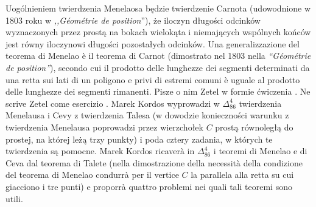 Uogólnieniem twierdzenia Menelaosa będzie twierdzenie Carnota (udowodnione w 1803 roku w \emph{,,Géométrie de position}''), że iloczyn długości odcinków wyznaczonych przez prostą na bokach wielokąta i niemających wspólnych końców jest równy iloczynowi długości pozostałych odcinków. %
Una generalizzazione del teorema di Menelao è il teorema di Carnot (dimostrato nel 1803 nella \emph{``Géométrie de position''}), secondo cui il prodotto delle lunghezze dei segmenti determinati da una retta sui lati di un poligono e privi di estremi comuni è uguale al prodotto delle lunghezze dei segmenti rimanenti. %
Pisze o nim Zetel w formie ćwiczenia \cite[s. 45]{zetel_2020}. %
Ne scrive Zetel come esercizio \cite[p. 45]{zetel_2020}. %
Marek Kordos wyprowadzi w $\Delta_{86}^{4}$ twierdzenia Menelausa i Cevy z twierdzenia Talesa (w dowodzie konieczności warunku z twierdzenia Menelausa poprowadzi przez wierzchołek $C$ prostą równoległą do prostej, na której leżą trzy punkty) i poda cztery zadania, w których te twierdzenia są pomocne. %
Marek Kordos ricaverà in $\Delta_{86}^{4}$ i teoremi di Menelao e di Ceva dal teorema di Talete (nella dimostrazione della necessità della condizione del teorema di Menelao condurrà per il vertice $C$ la parallela alla retta su cui giacciono i tre punti) e proporrà quattro problemi nei quali tali teoremi sono utili. %



%